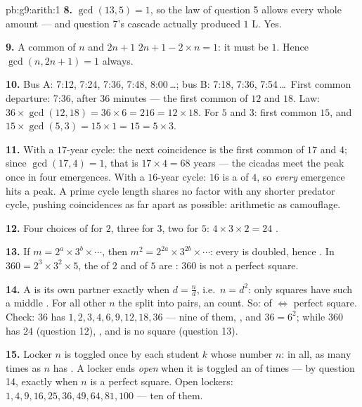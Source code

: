 \begin{solution}{pb:g9:arith:1}
\textbf{8.} $\gcd(13, 5) = 1$, so the law of question 5 allows
every whole amount --- and question 7's cascade actually
produced $1$ L. Yes.

\textbf{9.} A common  of $n$ and $2n + 1$ 
$2n + 1 - 2 \times n = 1$: it must be $1$. Hence
$\gcd(n, 2n+1) = 1$ always.

\textbf{10.} Bus A: 7:12, 7:24, 7:36, 7:48, 8:00\,\dots; bus B:
7:18, 7:36, 7:54\,\dots\ First common departure: 7:36, after
$36$ minutes --- the first common  of $12$ and $18$.
Law: $36 \times \gcd(12, 18) = 36 \times 6 = 216 = 12 \times
18$. For $5$ and $3$: first common  $15$, and
$15 \times \gcd(5,3) = 15 \times 1 = 15 = 5 \times 3$.

\textbf{11.} With a $17$-year cycle: the next coincidence is
the first common  of $17$ and $4$; since
$\gcd(17, 4) = 1$, that is $17 \times 4 = 68$ years --- the
cicadas meet the peak once in four emergences. With a
$16$-year cycle: $16$ is a  of $4$, so \emph{every}
emergence hits a peak. A prime cycle length shares no factor
with any shorter predator cycle, pushing coincidences as far
apart as possible: arithmetic as camouflage.

\textbf{12.} Four choices of  for $2$, three for $3$,
two for $5$: $4 \times 3 \times 2 = 24$ .

\textbf{13.} If $m = 2^{a} \times 3^{b} \times \cdots$, then
$m^2 = 2^{2a} \times 3^{2b} \times \cdots$: every  is
doubled, hence . In $360 = 2^3 \times 3^2 \times 5$, the
 of $2$ and of $5$ are : $360$ is not a perfect
square.

\textbf{14.} A  is its own partner exactly when
$d = \frac nd$, i.e.\ $n = d^2$: only squares have such a
middle . For all other $n$ the  split into
pairs, an  count. So:  of 
$\Leftrightarrow$ perfect square. Check: $36$ has 
$1, 2, 3, 4, 6, 9, 12, 18, 36$ --- nine of them, , and
$36 = 6^2$; while $360$ has $24$ (question 12), , and is
no square (question 13).

\textbf{15.} Locker $n$ is toggled once by each student $k$
whose number  $n$: in all, as many times as $n$ has
. A locker ends \emph{open} when it is toggled an  of times --- by question 14, exactly when $n$ is a
perfect square. Open lockers: $1, 4, 9, 16, 25, 36, 49, 64,
81, 100$ --- ten of them.
\end{solution}
